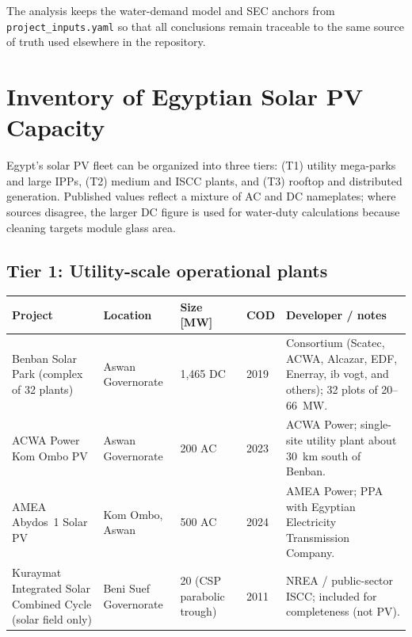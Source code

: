 \documentclass[11pt,a4paper]{article}
\begin{document}
The analysis keeps the water-demand model and SEC anchors from \texttt{project\_inputs.yaml} so that all conclusions remain traceable to the same source of truth used elsewhere in the repository.

\section{Inventory of Egyptian Solar PV Capacity}
Egypt's solar PV fleet can be organized into three tiers: (T1) utility mega-parks and large IPPs, (T2) medium and ISCC plants, and (T3) rooftop and distributed generation. Published values reflect a mixture of AC and DC nameplates; where sources disagree, the larger DC figure is used for water-duty calculations because cleaning targets module glass area.

\subsection{Tier 1: Utility-scale operational plants}
\begin{longtable}{@{}p{4.6cm}p{3.0cm}p{1.6cm}p{1.6cm}p{3.8cm}@{}}
\toprule
\textbf{Project} & \textbf{Location} & \textbf{Size [MW]} & \textbf{COD} & \textbf{Developer / notes} \\
\midrule
\endhead
Benban Solar Park (complex of 32 plants) & Aswan Governorate & 1{,}465 DC \cite{ieeeref_benban_wiki,ieeeref_benban_site} & 2019 & Consortium (Scatec, ACWA, Alcazar, EDF, Enerray, ib vogt, and others); 32 plots of 20--66~MW. \\
ACWA Power Kom Ombo PV & Aswan Governorate & 200 AC \cite{ieeeref_acwa_kom_ombo} & 2023 & ACWA Power; single-site utility plant about 30~km south of Benban. \\
AMEA Abydos~1 Solar PV & Kom Ombo, Aswan & 500 AC \cite{ieeeref_amea_abydos} & 2024 & AMEA Power; PPA with Egyptian Electricity Transmission Company. \\
Kuraymat Integrated Solar Combined Cycle (solar field only) & Beni Suef Governorate & 20 (CSP parabolic trough) \cite{ieeeref_nrea} & 2011 & NREA / public-sector ISCC; included for completeness (not PV). \\
\bottomrule
\end{longtable}
\end{document}
